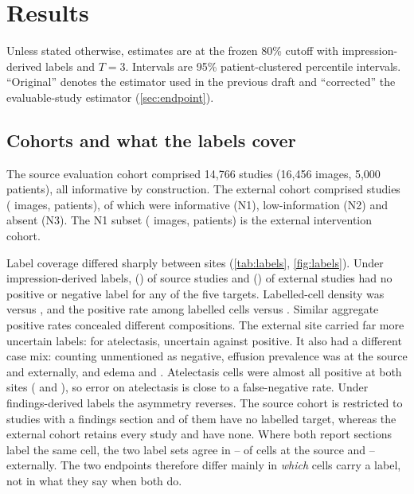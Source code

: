 \section{Results}
\label{sec:results}

Unless stated otherwise, estimates are at the frozen 80\% cutoff with
impression-derived labels and $T=3$. Intervals are 95\% patient-clustered
percentile intervals. ``Original'' denotes the estimator used in the previous
draft and ``corrected'' the evaluable-study estimator (\cref{sec:endpoint}).

\subsection{Cohorts and what the labels cover}
\label{sec:res-labels}
The source evaluation cohort comprised 14,766 studies (16,456 images, 5,000
patients), all informative by construction. The external cohort comprised
\ExtStudies{} studies (\ExtImages{} images, \ExtPatients{} patients), of which
\ExtNOne{} were informative (N1), \ExtNTwo{} low-information (N2) and \ExtNThree{}
absent (N3). The N1 subset (\ExtNOneImages{} images, \ExtNOnePatients{}
patients) is the external intervention cohort.

Label coverage differed sharply between sites (\cref{tab:labels},
\cref{fig:labels}). Under impression-derived labels, \NoLabSrcImpression{}
(\NoLabNSrcImpression{}) of source studies and \NoLabExtImpression{}
(\NoLabNExtImpression{}) of external studies had no positive or negative label
for any of the five targets. Labelled-cell density was \DensSrcImpression{}
versus \DensExtImpression{}, and the positive rate among labelled cells
\PosSrcImpression{} versus \PosExtImpression{}. Similar aggregate positive rates
concealed different compositions. The external site carried far more uncertain
labels: for atelectasis, \ExtAtelUnc{} uncertain against \ExtAtelPos{} positive.
It also had a different case mix: counting unmentioned as negative, effusion
prevalence was \SrcEffUnmNeg{} at the source and \ExtEffUnmNeg{} externally, and
edema \SrcEdemaUnmNeg{} and \ExtEdemaUnmNeg{}. Atelectasis cells were almost all
positive at both sites (\SrcAtelPosRate{} and \ExtAtelPosRate{}), so error on
atelectasis is close to a false-negative rate. Under findings-derived labels the
asymmetry reverses. The source cohort is restricted to studies with a findings
section and \NoLabSrcFindings{} of them have no labelled target, whereas the
external cohort retains every study and \NoLabExtFindings{} have none. Where
both report sections label the same cell, the two label sets agree in
\AgreeMinSrc{}--\AgreeMaxSrc{} of cells at the source and
\AgreeMinExt{}--\AgreeMaxExt{} externally. The two endpoints therefore differ
mainly in \emph{which} cells carry a label, not in what they say when both do.

